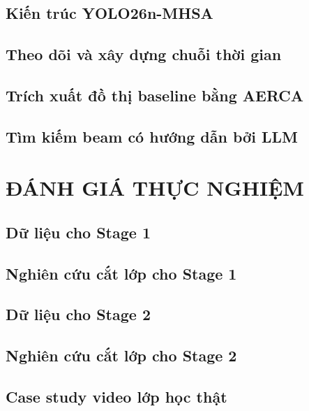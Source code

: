 \documentclass[a4paper,13pt,3p,twoside]{report}
\numberwithin{equation}{chapter}
\theoremstyle{definition}
\begin{document}
\section{Kiến trúc YOLO26n-MHSA}


\section{Theo dõi và xây dựng chuỗi thời gian}


\section{Trích xuất đồ thị baseline bằng AERCA}


\section{Tìm kiếm beam có hướng dẫn bởi LLM}


\newpage
\chapter{ĐÁNH GIÁ THỰC NGHIỆM}

\section{Dữ liệu cho Stage 1}


\section{Nghiên cứu cắt lớp cho Stage 1}


\section{Dữ liệu cho Stage 2}


\section{Nghiên cứu cắt lớp cho Stage 2}


\section{Case study video lớp học thật}

\end{document}
